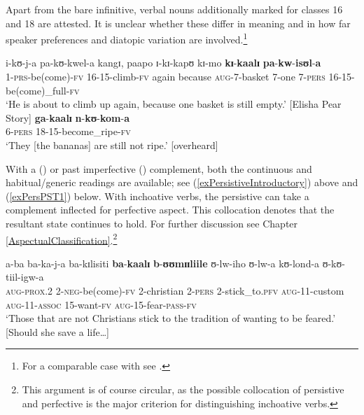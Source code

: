 \newpage
Apart from the bare infinitive, verbal nouns additionally marked for  classes 16 and 18 are attested. It is unclear whether these differ in meaning and in how far speaker preferences and diatopic variation are involved.\footnote{For a comparable case with  see .}

\begin{exe}
\ex \label{exPers16INF}
\gll i-kʊ-j-a pa-kʊ-kwel-a kangɪ, paapo ɪ-kɪ-kapʊ kɪ-mo \textbf{kɪ}-\textbf{kaalɪ} \textbf{pa}-\textbf{kw}-\textbf{isʊl}-\textbf{a}\\
1-\textsc{prs}-be(come)-\textsc{fv} 16-15-climb-\textsc{fv} again because \textsc{aug}-7-basket 7-one 7-\textsc{pers} 16-15-be(come)\_full-\textsc{fv}\\
\glt \lq He is about to climb up again, because one basket is still empty.' [Elisha Pear Story]
\ex \label{exPers18INF}
\gll \textbf{ga}-\textbf{kaalɪ} \textbf{n}-\textbf{kʊ}-\textbf{kom}-\textbf{a}\\
6-\textsc{pers} 18-15-become\_ripe-\textsc{fv}\\
\glt \lq They [the bananas] are still not ripe.' [overheard]
\end{exe} 

With a  () or past imperfective () complement, both the continuous and habitual/generic readings are available; see (\ref{exPersistiveIntroductory}) above and (\ref{exPersPST1}) below. With inchoative verbs, the persistive can take a complement inflected for perfective aspect. This collocation denotes that the resultant state continues to hold. For further discussion see Chapter \ref{AspectualClassification}.\footnote{This argument is of course circular, as the possible collocation of persistive and perfective is the major criterion for distinguishing inchoative verbs.}

\begin{exe}
\ex \gll a-ba ba-ka-j-a ba-kɪlisiti \textbf{ba}-\textbf{kaalɪ} \textbf{b}-\textbf{ʊʊmɪɪliile} ʊ-lw-iho ʊ-lw-a kʊ-lond-a ʊ-kʊ-tiil-igw-a\\
\textsc{aug}-\textsc{prox.2} 2-\textsc{neg}-be(come)-\textsc{fv} 2-christian 2-\textsc{pers} 2-stick\_to.\textsc{pfv} \textsc{aug}-11-custom \textsc{aug}-11-\textsc{assoc} 15-want-\textsc{fv} \textsc{aug}-15-fear-\textsc{pass}-\textsc{fv}\\
\glt `Those that are not Christians stick to the tradition of wanting to be feared.' [Should she save a life\ldots]
\end{exe}

